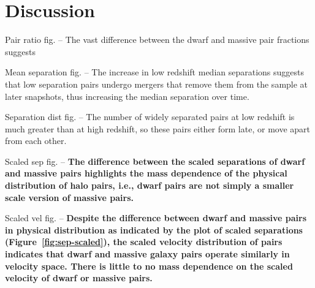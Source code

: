 \documentclass[twocolumn]{aastex631}
\begin{document}
\section{Discussion}
\label{sec:discussion}

Pair ratio fig. -- The vast difference between the dwarf and massive pair fractions suggests  

Mean separation fig. -- The increase in low redshift median separations suggests that low separation pairs undergo mergers that remove them from the sample at later snapshots, thus increasing the median separation over time.

Separation dist fig. -- The number of widely separated pairs at low redshift is much greater than at high redshift, so these pairs either form late, or move apart from each other. 

Scaled sep fig. -- \textbf{The difference between the scaled separations of dwarf and massive pairs highlights the mass dependence of the physical distribution of halo pairs, i.e., dwarf pairs are not simply a smaller scale version of massive pairs.}

Scaled vel fig. --   \textbf{Despite the difference between dwarf and massive pairs in physical distribution as indicated by the plot of scaled separations (Figure~\ref{fig:sep-scaled}), the scaled velocity distribution of pairs indicates that dwarf and massive galaxy pairs operate similarly in velocity space. There is little to no mass dependence on the scaled velocity of dwarf or massive pairs.}
\end{document}
